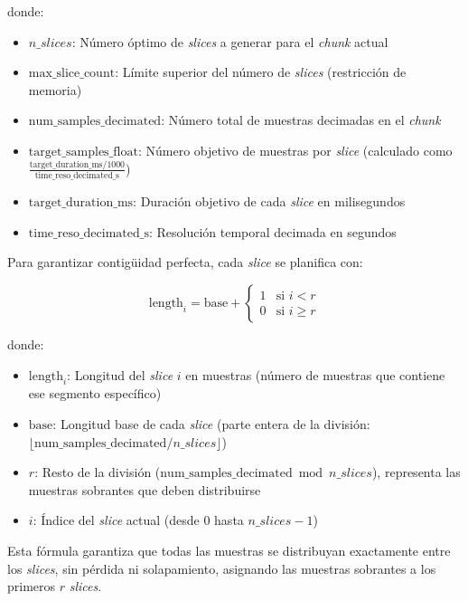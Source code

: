 donde:
\begin{itemize}
    \item $n\_slices$: Número óptimo de \emph{slices} a generar para el \emph{chunk} actual
    \item $\text{max\_slice\_count}$: Límite superior del número de \emph{slices} (restricción de memoria)
    \item $\text{num\_samples\_decimated}$: Número total de muestras decimadas en el \emph{chunk}
    \item $\text{target\_samples\_float}$: Número objetivo de muestras por \emph{slice} (calculado como $\frac{\text{target\_duration\_ms}/1000}{\text{time\_reso\_decimated\_s}}$)
    \item $\text{target\_duration\_ms}$: Duración objetivo de cada \emph{slice} en milisegundos
    \item $\text{time\_reso\_decimated\_s}$: Resolución temporal decimada en segundos
\end{itemize}

Para garantizar contigüidad perfecta, cada \emph{slice} se planifica con:

\[
\text{length}_i = \text{base} + \begin{cases} 
1 & \text{si } i < r \\
0 & \text{si } i \geq r
\end{cases}
\]

donde:
\begin{itemize}
    \item $\text{length}_i$: Longitud del \emph{slice} $i$ en muestras (número de muestras que contiene ese segmento específico)
    \item $\text{base}$: Longitud base de cada \emph{slice} (parte entera de la división: $\lfloor \text{num\_samples\_decimated} / n\_slices \rfloor$)
    \item $r$: Resto de la división ($\text{num\_samples\_decimated} \bmod n\_slices$), representa las muestras sobrantes que deben distribuirse
    \item $i$: Índice del \emph{slice} actual (desde 0 hasta $n\_slices - 1$)
\end{itemize}

Esta fórmula garantiza que todas las muestras se distribuyan exactamente entre los \emph{slices}, sin pérdida ni solapamiento, asignando las muestras sobrantes a los primeros $r$ \emph{slices}.

